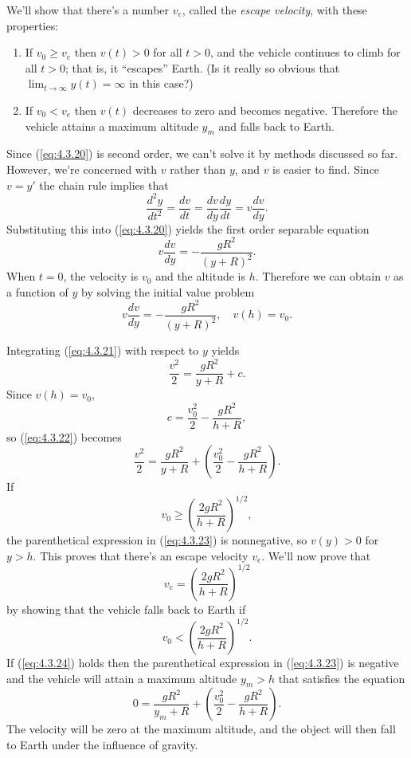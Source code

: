 \documentclass{ximera}
\begin{document}
We'll show that there's a number $v_e$, called the \textit{escape
velocity}, with these properties:
 
\begin{enumerate}
\item If $v_0\geq v_e$ then $v(t)>0$ for all $t>0$, and the vehicle
continues to climb for all $t>0$; that is, it ``escapes'' Earth.
(Is it really so obvious that $\lim_{t\rightarrow\infty}y(t)=\infty$
in this case?)
\item  If $v_0<v_e$  then  $v(t)$   decreases to zero and becomes negative.
Therefore
 the vehicle attains a  maximum
altitude  $y_m$ and
falls back to Earth.
 \end{enumerate}
 
Since
(\ref{eq:4.3.20}) is second order, we can't solve it by methods discussed
so far. However, we're concerned with $v$ rather than $y$, and $v$ is
easier to find. Since $v=y'$ the chain rule implies that
$$
\frac{d^2y}{dt^2}=\frac{dv}{dt}=\frac{dv}{dy}\frac{dy}{dt}=v\frac{dv}{dy}.
$$
 Substituting this into (\ref{eq:4.3.20}) yields the first order
separable equation
\begin{equation} \label{eq:4.3.21}
v\frac{dv}{dy}=-\frac{gR^2}{(y+R)^2}.
\end{equation}
When $t=0$, the velocity is $v_0$ and the altitude is $h$. Therefore
we can
obtain $v$ as a function of $y$ by solving the initial value problem
$$
v\frac{dv}{dy}=-\frac{gR^2}{(y+R)^2},\quad  v(h)=v_0.
$$
 
Integrating (\ref{eq:4.3.21}) with respect to $y$ yields
\begin{equation} \label{eq:4.3.22}
\frac{v^2}{2}=\frac{gR^2}{y+R}+c.
\end{equation}
 Since $v(h)=v_0$,
$$
c=\frac{v_0^2}{2}-\frac{gR^2}{h+R},
$$
 so (\ref{eq:4.3.22}) becomes
\begin{equation} \label{eq:4.3.23}
\frac{v^2}{2}=\frac{gR^2}{y+R}+\left(\frac{v_0^2}{2}-
\frac{gR^2}{h+R}\right).
\end{equation}
If
$$
v_0 \geq\left(\frac{2gR^2}{h+R}\right)^{1/2},
$$
 the parenthetical expression in (\ref{eq:4.3.23})  is nonnegative,
 so $v(y)>0$ for $y>h$. This proves that there's an escape
velocity $v_e$. We'll now prove that
$$
v_e=\left(\frac{2gR^2}{h+R}\right)^{1/2}
$$
by showing that the vehicle falls back to Earth if
\begin{equation} \label{eq:4.3.24}
v_0 <\left(\frac{2gR^2}{h+R}\right)^{1/2}.
\end{equation}
If (\ref{eq:4.3.24})  holds then  the parenthetical expression in
(\ref{eq:4.3.23})
is negative and the vehicle will attain a maximum altitude $y_m>h$
that satisfies the equation
$$
0=\frac{gR^2}{y_m+R}+\left(\frac{v_0^2}{2}-
\frac{gR^2}{h+R}\right).
$$
The velocity will be zero at the maximum  altitude, and the object will
then fall to Earth under the influence of gravity.
\end{document}

